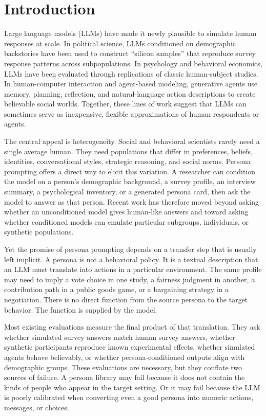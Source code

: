 \documentclass[11pt]{article}
\begin{document}
\section{Introduction}

Large language models (LLMs) have made it newly plausible to simulate human responses at scale. In political science, LLMs conditioned on demographic backstories have been used to construct ``silicon samples'' that reproduce survey response patterns across subpopulations. In psychology and behavioral economics, LLMs have been evaluated through replications of classic human-subject studies. In human-computer interaction and agent-based modeling, generative agents use memory, planning, reflection, and natural-language action descriptions to create believable social worlds. Together, these lines of work suggest that LLMs can sometimes serve as inexpensive, flexible approximations of human respondents or agents.

The central appeal is heterogeneity. Social and behavioral scientists rarely need a single average human. They need populations that differ in preferences, beliefs, identities, conversational styles, strategic reasoning, and social norms. Persona prompting offers a direct way to elicit this variation. A researcher can condition the model on a person's demographic background, a survey profile, an interview summary, a psychological inventory, or a generated persona card, then ask the model to answer as that person. Recent work has therefore moved beyond asking whether an unconditioned model gives human-like answers and toward asking whether conditioned models can emulate particular subgroups, individuals, or synthetic populations.

Yet the promise of persona prompting depends on a transfer step that is usually left implicit. A persona is not a behavioral policy. It is a textual description that an LLM must translate into actions in a particular environment. The same profile may need to imply a vote choice in one study, a fairness judgment in another, a contribution path in a public goods game, or a bargaining strategy in a negotiation. There is no direct function from the source persona to the target behavior. The function is supplied by the model.

Most existing evaluations measure the final product of that translation. They ask whether simulated survey answers match human survey answers, whether synthetic participants reproduce known experimental effects, whether simulated agents behave believably, or whether persona-conditioned outputs align with demographic groups. These evaluations are necessary, but they conflate two sources of failure. A persona library may fail because it does not contain the kinds of people who appear in the target setting. Or it may fail because the LLM is poorly calibrated when converting even a good persona into numeric actions, messages, or choices.
\end{document}
